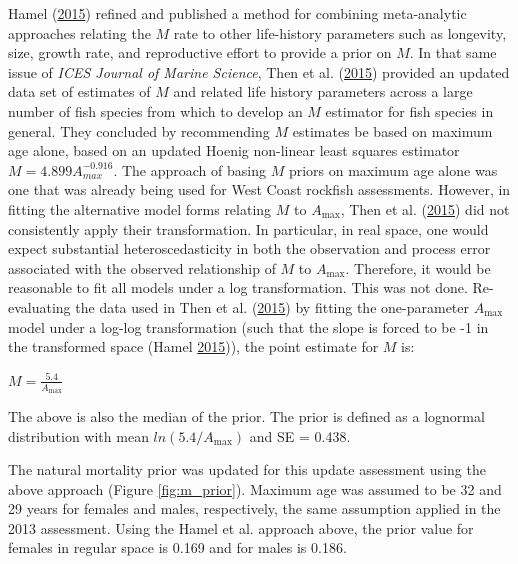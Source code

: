 \documentclass[12pt,]{article}
\begin{document}
Hamel (\protect\hyperlink{ref-hamel_method_2015}{2015}) refined and
published a method for combining meta-analytic approaches relating the
\(M\) rate to other life-history parameters such as longevity, size,
growth rate, and reproductive effort to provide a prior on \(M\). In
that same issue of \emph{ICES Journal of Marine Science}, Then et al.
(\protect\hyperlink{ref-then_evaluating_2015}{2015}) provided an updated
data set of estimates of \(M\) and related life history parameters
across a large number of fish species from which to develop an \(M\)
estimator for fish species in general. They concluded by recommending
\(M\) estimates be based on maximum age alone, based on an updated
Hoenig non-linear least squares estimator \(M=4.899A^{-0.916}_{max}\).
The approach of basing \(M\) priors on maximum age alone was one that
was already being used for West Coast rockfish assessments. However, in
fitting the alternative model forms relating \(M\) to
\(A_{\text{max}}\), Then et al.
(\protect\hyperlink{ref-then_evaluating_2015}{2015}) did not
consistently apply their transformation. In particular, in real space,
one would expect substantial heteroscedasticity in both the observation
and process error associated with the observed relationship of \(M\) to
\(A_{\text{max}}\). Therefore, it would be reasonable to fit all models
under a log transformation. This was not done. Re-evaluating the data
used in Then et al. (\protect\hyperlink{ref-then_evaluating_2015}{2015})
by fitting the one-parameter \(A_{\text{max}}\) model under a log-log
transformation (such that the slope is forced to be -1 in the
transformed space (Hamel
\protect\hyperlink{ref-hamel_method_2015}{2015})), the point estimate
for \(M\) is:

\begin{centering}

$M=\frac{5.4}{A_{\text{max}}}$

\end{centering}

The above is also the median of the prior. The prior is defined as a
lognormal distribution with mean \(ln(5.4/A_{\text{max}})\) and SE =
0.438.

The natural mortality prior was updated for this update assessment using
the above approach (Figure \ref{fig:m_prior}). Maximum age was assumed
to be 32 and 29 years for females and males, respectively, the same
assumption applied in the 2013 assessment. Using the Hamel et al.
approach above, the prior value for females in regular space is 0.169
and for males is 0.186.
\end{document}
